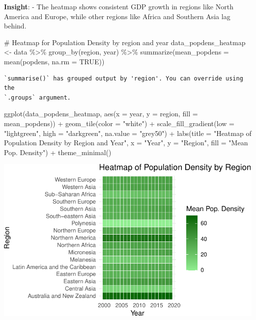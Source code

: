\documentclass[
  letterpaper,
  DIV=11,
  numbers=noendperiod]{scrartcl}
\newenvironment{Shaded}{\begin{snugshade}}{\end{snugshade}}
\newcommand{\AttributeTok}[1]{\textcolor[rgb]{0.40,0.45,0.13}{#1}}
\newcommand{\CommentTok}[1]{\textcolor[rgb]{0.37,0.37,0.37}{#1}}
\newcommand{\ConstantTok}[1]{\textcolor[rgb]{0.56,0.35,0.01}{#1}}
\newcommand{\FunctionTok}[1]{\textcolor[rgb]{0.28,0.35,0.67}{#1}}
\newcommand{\NormalTok}[1]{\textcolor[rgb]{0.00,0.23,0.31}{#1}}
\newcommand{\OtherTok}[1]{\textcolor[rgb]{0.00,0.23,0.31}{#1}}
\newcommand{\SpecialCharTok}[1]{\textcolor[rgb]{0.37,0.37,0.37}{#1}}
\newcommand{\StringTok}[1]{\textcolor[rgb]{0.13,0.47,0.30}{#1}}
\begin{document}
\textbf{Insight}: - The heatmap shows consistent GDP growth in regions
like North America and Europe, while other regions like Africa and
Southern Asia lag behind.

\begin{Shaded}
\begin{Highlighting}[]
\CommentTok{\# Heatmap for Population Density by region and year}
\NormalTok{data\_popdens\_heatmap }\OtherTok{\textless{}{-}}\NormalTok{ data }\SpecialCharTok{\%\textgreater{}\%} 
  \FunctionTok{group\_by}\NormalTok{(region, year) }\SpecialCharTok{\%\textgreater{}\%}
  \FunctionTok{summarize}\NormalTok{(}\AttributeTok{mean\_popdens =} \FunctionTok{mean}\NormalTok{(popdens, }\AttributeTok{na.rm =} \ConstantTok{TRUE}\NormalTok{))}
\end{Highlighting}
\end{Shaded}

\begin{verbatim}
`summarise()` has grouped output by 'region'. You can override using the
`.groups` argument.
\end{verbatim}

\begin{Shaded}
\begin{Highlighting}[]
\FunctionTok{ggplot}\NormalTok{(data\_popdens\_heatmap, }\FunctionTok{aes}\NormalTok{(}\AttributeTok{x =}\NormalTok{ year, }\AttributeTok{y =}\NormalTok{ region, }\AttributeTok{fill =}\NormalTok{ mean\_popdens)) }\SpecialCharTok{+}
  \FunctionTok{geom\_tile}\NormalTok{(}\AttributeTok{color =} \StringTok{"white"}\NormalTok{) }\SpecialCharTok{+}
  \FunctionTok{scale\_fill\_gradient}\NormalTok{(}\AttributeTok{low =} \StringTok{"lightgreen"}\NormalTok{, }\AttributeTok{high =} \StringTok{"darkgreen"}\NormalTok{, }\AttributeTok{na.value =} \StringTok{"grey50"}\NormalTok{) }\SpecialCharTok{+}
  \FunctionTok{labs}\NormalTok{(}\AttributeTok{title =} \StringTok{"Heatmap of Population Density by Region and Year"}\NormalTok{, }\AttributeTok{x =} \StringTok{"Year"}\NormalTok{, }\AttributeTok{y =} \StringTok{"Region"}\NormalTok{, }\AttributeTok{fill =} \StringTok{"Mean Pop. Density"}\NormalTok{) }\SpecialCharTok{+}
  \FunctionTok{theme\_minimal}\NormalTok{()}
\end{Highlighting}
\end{Shaded}

\includegraphics{EDA_files/figure-pdf/unnamed-chunk-14-1.pdf}
\end{document}
